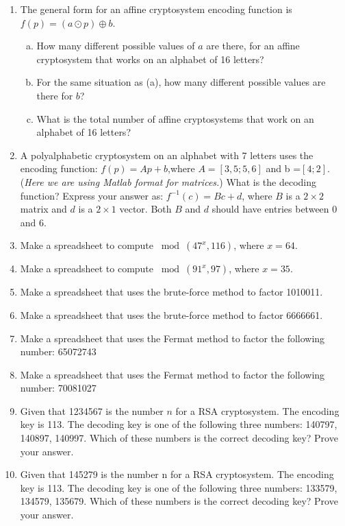 \begin{enumerate}
\item
The general form for an affine cryptosystem encoding function is $f(p) =(a\odot p) \oplus b$.
\begin{enumerate}[(a)]
\item
 How many different possible values of $a$ are there, for an affine cryptosystem that works on  an alphabet of 16 letters?
\item	
For the same situation as (a), how many different possible values are there for $b$?
\item	
What is the total number of affine cryptosystems that work on an alphabet of 16 letters?
\end{enumerate}

\item
A polyalphabetic cryptosystem on an alphabet with 7 letters uses the encoding function:
$f(p)= Ap + b$,where $A=[3 , 5; 5, 6]$ and b =$ [4 ; 2]$. (\emph{Here we are using Matlab format for matrices.})  
What is the decoding function? Express your answer as:  $ f^{-1}(c) = Bc + d$, where $B$  is a $2\times 2$ matrix and $d$ is a $2 \times 1$ vector.  Both $B$ and $d$ should have entries between 0 and 6.

\item	
Make a spreadsheet to compute  $\bmod(47^x, 116)$, where $x = 64$.

\item
Make a spreadsheet to compute $\bmod(91^x, 97)$, where $x = 35$.

\item	
Make a spreadsheet that uses the brute-force method to factor 1010011.

\item	
Make a spreadsheet that uses the brute-force method to factor 6666661.

\item 
Make a spreadsheet that uses the Fermat method to factor the following number: 65072743

\item 	
Make a spreadsheet that uses the Fermat method to factor the following number: 70081027

\item	
Given that 1234567 is the number $n$ for a RSA cryptosystem.  The encoding key is 113. The decoding key is one of the following three numbers: 140797, 140897, 140997. Which of these numbers is the correct decoding key? Prove your answer.

\item
Given that 145279  is the number n for a RSA cryptosystem.  The encoding key is 113. The decoding key is one of the following three numbers:
133579, 134579, 135679.
Which of these numbers is the correct decoding key? Prove your answer.
	
\end{enumerate}


